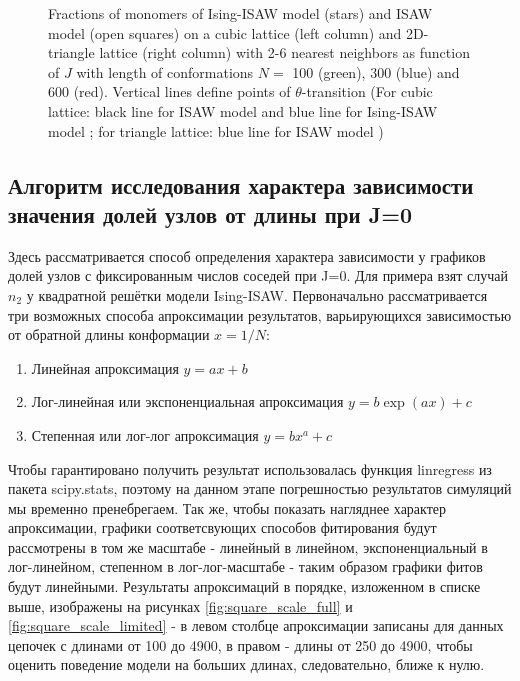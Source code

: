 \begin{figure}
    \caption{Fractions of monomers of Ising-ISAW model (stars) and ISAW model (open squares) on a cubic lattice (left column) and 2D-triangle lattice (right column) with 2-6 nearest neighbors as function of $J$ with length of conformations $N = $ 100 (green), 300 (blue) and 600 (red). Vertical lines define points of $\theta$-transition (For cubic lattice: black line for ISAW model \cite{Tesi1996} and blue line for Ising-ISAW model \cite{foster2021critical}; for triangle lattice: blue line for ISAW model \cite{Privman1986})}
    \label{fig:Ising_vs_ISAW}
\end{figure}

\newpage

\subsection{Алгоритм исследования характера зависимости значения долей узлов от длины при J=0}

Здесь рассматривается способ определения характера зависимости у графиков долей узлов с фиксированным числов соседей при J=0. Для примера взят случай $n_{2}$ у квадратной решётки модели Ising-ISAW. Первоначально рассматривается три возможных способа апроксимации результатов, варьирующихся зависимостью от обратной длины конформации $x = 1/N$:

\begin{enumerate}
    \item Линейная апроксимация $y = a x + b$
    \item Лог-линейная или экспоненциальная апроксимация $y = b \exp{(a x)} + c $
    \item Степенная или лог-лог апроксимация $y = b x^{a} + c  $
\end{enumerate}

Чтобы гарантировано получить результат использовалась функция linregress из пакета scipy.stats, поэтому на данном этапе погрешностью результатов симуляций мы временно пренебрегаем. Так же, чтобы показать нагляднее характер апроксимации, графики соответсвующих способов фитирования будут рассмотрены в том же масштабе - линейный в линейном, экспоненциальный в лог-линейном, степенном в лог-лог-масштабе - таким образом графики фитов будут линейными. Результаты апроксимаций в порядке, изложенном в списке выше, изображены на рисунках \ref{fig:square_scale_full} и \ref{fig:square_scale_limited} - в левом столбце апроксимации записаны для данных цепочек с длинами от 100 до 4900, в правом - длины от 250 до 4900, чтобы оценить поведение модели на больших длинах, следовательно, ближе к нулю.

